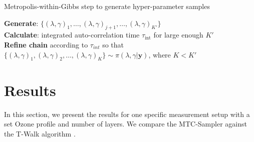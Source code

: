 \begin{algorithm}[thb!]
    \caption{Metropolis-within-Gibbs step to generate hyper-parameter samples}
    \label{alg:MwG}
    \SetAlgoLined
    \nonl
    \textbf{Generate}: $\{ (\lambda, \gamma )_{1}, \dots ,(\lambda, \gamma )_{j+1}, \dots ,(\lambda, \gamma )_{K'}\}$\\
    \textbf{Calculate}: integrated auto-correlation time $\tau_{\text{int}}$ for large enough $K'$\\
    \textbf{Refine chain} according to $\tau_{int}$ so that $   \{(\lambda, \gamma )_{1}, (\lambda, \gamma )_{2} ,\dots ,(\lambda, \gamma )_{K}\} \sim \pi(   \lambda, \gamma | \bm{y} )$, where $ K < K'$
\end{algorithm}
\clearpage

\section{Results}
\label{sec:Results}
In this section, we present the results for one specific measurement setup with a set Ozone profile and number of layers.
We compare the MTC-Sampler against the T-Walk algorithm \cite{christen2010general}.

